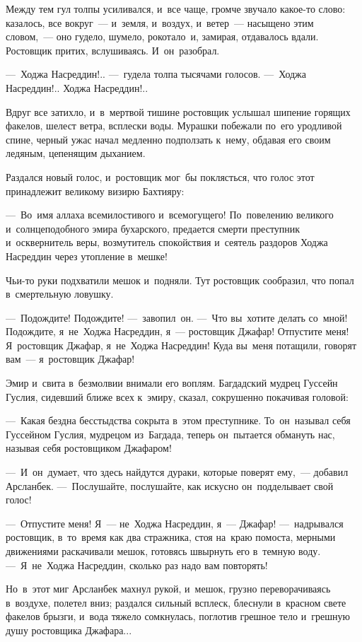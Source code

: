 \documentclass[12pt,a4paper]{book}
\begin{document}
Между тем гул толпы усиливался, и~все чаще, громче звучало какое-то слово: казалось, все вокруг~— и~земля, и~воздух, и~ветер~— насыщено этим словом,~— оно гудело, шумело, рокотало~и, замирая, отдавалось вдали. Ростовщик притих, вслушиваясь. И~он~разобрал.

—~Ходжа Насреддин!.. —~гудела толпа тысячами голосов. —~Ходжа Насреддин!.. Ходжа Насреддин!..

Вдруг все затихло, и~в~мертвой тишине ростовщик услышал шипение горящих факелов, шелест ветра, всплески воды. Мурашки побежали по~его уродливой спине, черный ужас начал медленно подползать к~нему, обдавая его своим ледяным, цепенящим дыханием.

Раздался новый голос, и~ростовщик мог~бы поклясться, что голос этот принадлежит великому визирю Бахтияру:

—~Во~имя аллаха всемилостивого и~всемогущего! По~повелению великого и~солнцеподобного эмира бухарского, предается смерти преступник и~осквернитель веры, возмутитель спокойствия и~сеятель раздоров Ходжа Насреддин через утопление в~мешке!

Чьи-то руки подхватили мешок и~подняли. Тут ростовщик сообразил, что попал в~смертельную ловушку.

—~Подождите! Подождите! —~завопил~он. —~Что вы~хотите делать со~мной! Подождите, я~не~Ходжа Насреддин, я~— ростовщик Джафар! Отпустите меня! Я~ростовщик Джафар, я~не~Ходжа Насреддин! Куда вы~меня потащили, говорят вам~— я~ростовщик Джафар!

Эмир и~свита в~безмолвии внимали его воплям. Багдадский мудрец Гуссейн Гуслия, сидевший ближе всех к~эмиру, сказал, сокрушенно покачивая головой:

—~Какая бездна бесстыдства сокрыта в~этом преступнике. То~он~называл себя Гуссейном Гуслия, мудрецом из~Багдада, теперь он~пытается обмануть нас, называя себя ростовщиком Джафаром!

—~И~он~думает, что здесь найдутся дураки, которые поверят ему,~— добавил Арсланбек. —~Послушайте, послушайте, как искусно он~подделывает свой голос!

—~Отпустите меня! Я~— не~Ходжа Насреддин, я~— Джафар! —~надрывался ростовщик, в~то~время как два стражника, стоя на~краю помоста, мерными движениями раскачивали мешок, готовясь швырнуть его в~темную воду. —~Я~не~Ходжа Насреддин, сколько раз надо вам повторять!

Но~в~этот миг Арсланбек махнул рукой, и~мешок, грузно переворачиваясь в~воздухе, полетел вниз; раздался сильный всплеск, блеснули в~красном свете факелов брызги, и~вода тяжело сомкнулась, поглотив грешное тело и~грешную душу ростовщика Джафара...
\end{document}

